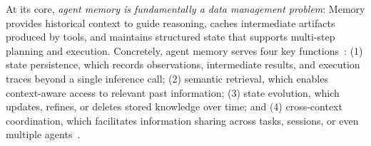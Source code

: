 



At its core, \textit{agent memory is fundamentally a data management problem}: Memory provides historical context to guide reasoning, caches intermediate artifacts produced by tools, and maintains structured state that supports multi-step planning and execution. Concretely, agent memory serves four key functions~\cite{hu2025memory, packer2023memgpt}: (1) state persistence, which records observations, intermediate results, and execution traces beyond a single inference call; (2) semantic retrieval, which enables context-aware access to relevant past information; (3) state evolution, which updates, refines, or deletes stored knowledge over time; and (4) cross-context coordination, which facilitates information sharing across tasks, sessions, or even multiple agents~\cite{wang2025mirix}. 


